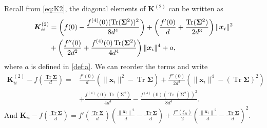 \documentclass[twoside,11pt]{article}
\newcommand{\norm}[1]{\left\|#1\right\|}
\def\bK{{\boldsymbol K}}
\def\bx{{\boldsymbol x}}
\def\bSigma{{\boldsymbol \Sigma}}
\newcommand{\bKquad}{\bK^{(2)}}
\renewcommand{\bK}{\boldsymbol{K}}
\newcommand{\Tr}{\operatorname{Tr}}
\newcommand{\1}{\mathbf{1}}
\begin{document}
Recall from \eqref{eq:K2}, the diagonal elements of $\bKquad$ can be written as 
\begin{align}
\bKquad_{ii}&=\left(f(0) -\frac{f^{(4)}(0)(\Tr(\bSigma^2))^2}{8d^4}\right) + \left(\frac{f'(0)}{d}+\frac{\Tr(\bSigma^2)}{2d^3} \right)\|\bx_i\|^2  \notag\\
&+\left(\frac{f''(0)}{2d^2}+\frac{f^{(4)}(0)\Tr(\bSigma^2)}{4d^4}\right) \|\bx_i\|^4+ a , \notag 
\end{align}
where  $a$ is defined in \eqref{def:a}. We can reorder the terms and write
\begin{align}
 \bKquad_{ii}-f\left(\frac{\Tr\bSigma}{d}\right)=&\frac{f'(0)}{d} \left( \|\bx_i\|^2-\Tr\bSigma \right)+\frac{f''(0)}{2d^2}\left(  \|\bx_i\|^4-(\Tr\bSigma)^2\right) \\
 & +\frac{f^{(4)}(0) \Tr(\bSigma^2)}{4d^4}-\frac{f^{(4)}(0) (\Tr(\bSigma^2))^2}{8d^4}.\label{eq:Kii2}
\end{align}
And
 $\bK_{ii}-f\left(\frac{\Tr\bSigma}{d}\right)=f'\left( \frac{\Tr\bSigma}{d}\right)\left( \frac{\norm{\bx_i}^2}{d}-\frac{\Tr\bSigma}{d}\right)+\frac{f''(\xi_{ii})}{2}\left( \frac{\norm{\bx_i}^2}{d}-\frac{\Tr\bSigma}{d}\right)^2$.
\end{document}
